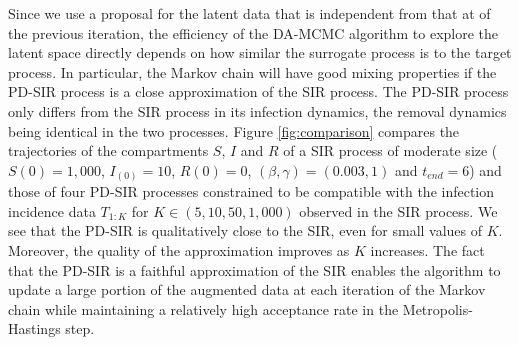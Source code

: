 \documentclass[11pt]{article}
\begin{document}
	Since we use a proposal for the latent data that is independent from that at of the previous iteration, the efficiency of the DA-MCMC algorithm to explore the latent space directly depends on how similar the surrogate process is to the target process. In particular, the Markov chain will have good mixing properties if the PD-SIR process is a close approximation of the SIR process. The PD-SIR process only differs from the SIR process in its infection dynamics, the removal dynamics being identical in the two processes. Figure \ref{fig:comparison} compares the trajectories of the compartments $S$, $I$ and $R$ of a SIR process of moderate size ($S(0) = 1,000$, $I_(0) = 10$, $R(0) = 0$, $(\beta, \gamma) = (0.003, 1)$ and $t_{end} = 6$) and those of four PD-SIR processes constrained to be compatible with the infection incidence data $T_{1:K}$ for $K \in (5, 10, 50, 1,000)$ observed in the SIR process. We see that the PD-SIR is qualitatively close to the SIR, even for small values of $K$. Moreover, the quality of the approximation improves as $K$ increases. 
	The fact that the PD-SIR is a faithful approximation of the SIR enables the algorithm to update a large portion of the augmented data at each iteration of the Markov chain while maintaining a relatively high acceptance rate in the Metropolis-Hastings step.
		
\end{document}
